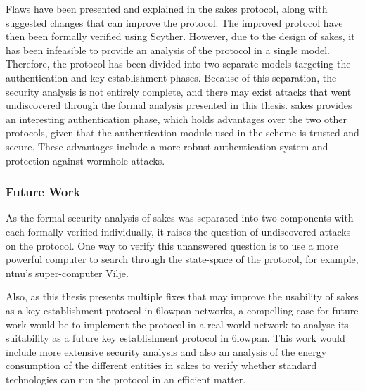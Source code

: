 Flaws have been presented and explained in the \gls{sakes} protocol, along with suggested changes that can improve the protocol. The improved protocol have then been formally verified using Scyther. However, due to the design of \gls{sakes}, it has been infeasible to provide an analysis of the protocol in a single model. Therefore, the protocol has been divided into two separate models targeting the authentication and key establishment phases. Because of this separation, the security analysis is not entirely complete, and there may exist attacks that went undiscovered through the formal analysis presented in this thesis. \gls{sakes} provides an interesting authentication phase, which holds advantages over the two other protocols, given that the authentication module used in the scheme is trusted and secure. These advantages include a more robust authentication system and protection against wormhole attacks.

\subsubsection{Future Work}

As the formal security analysis of \gls{sakes} was separated into two components with each formally verified individually, it raises the question of undiscovered attacks on the protocol. One way to verify this unanswered question is to use a more powerful computer to search through the state-space of the protocol, for example, \gls{ntnu}'s super-computer Vilje.  

Also, as this thesis presents multiple fixes that may improve the usability of \gls{sakes} as a key establishment protocol in \gls{6lowpan} networks, a compelling case for future work would be to implement the protocol in a real-world network to analyse its suitability as a future key establishment protocol in \gls{6lowpan}. This work would include more extensive security analysis and also an analysis of the energy consumption of the different entities in \gls{sakes} to verify whether standard technologies can run the protocol in an efficient matter.






%